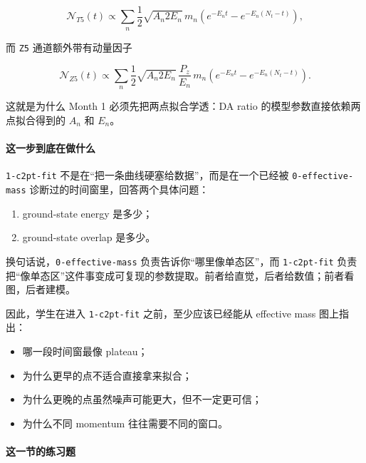 \documentclass[11pt,a4paper,fontset=fandol]{ctexart}
\begin{document}
\begin{equation}
\mathcal{N}_{T5}(t) \propto
\sum_n \frac{1}{2}\sqrt{A_n 2E_n}\,m_n
\left(e^{-E_n t} - e^{-E_n (N_t-t)}\right),
\end{equation}

而 \lstinline|Z5| 通道额外带有动量因子

\begin{equation}
 \mathcal{N}_{Z5}(t) \propto
\sum_n \frac{1}{2}\sqrt{A_n 2E_n}\,\frac{P_z}{E_n}\,m_n
\left(e^{-E_n t} - e^{-E_n (N_t-t)}\right).
\end{equation}

这就是为什么 Month 1 必须先把两点拟合学透：DA ratio 的模型参数直接依赖两点拟合得到的 $A_n$ 和 $E_n$。

\paragraph{这一步到底在做什么}

\lstinline|1-c2pt-fit| 不是在“把一条曲线硬塞给数据”，而是在一个已经被 \lstinline|0-effective-mass| 诊断过的时间窗里，回答两个具体问题：

\begin{enumerate}[leftmargin=2em]
  \item ground-state energy 是多少；
  \item ground-state overlap 是多少。
\end{enumerate}

换句话说，\lstinline|0-effective-mass| 负责告诉你“哪里像单态区”，而 \lstinline|1-c2pt-fit| 负责把“像单态区”这件事变成可复现的参数提取。前者给直觉，后者给数值；前者看图，后者建模。

因此，学生在进入 \lstinline|1-c2pt-fit| 之前，至少应该已经能从 effective mass 图上指出：

\begin{itemize}[leftmargin=2em]
  \item 哪一段时间窗最像 plateau；
  \item 为什么更早的点不适合直接拿来拟合；
  \item 为什么更晚的点虽然噪声可能更大，但不一定更可信；
  \item 为什么不同 momentum 往往需要不同的窗口。
\end{itemize}

\paragraph{这一节的练习题}
\end{document}
